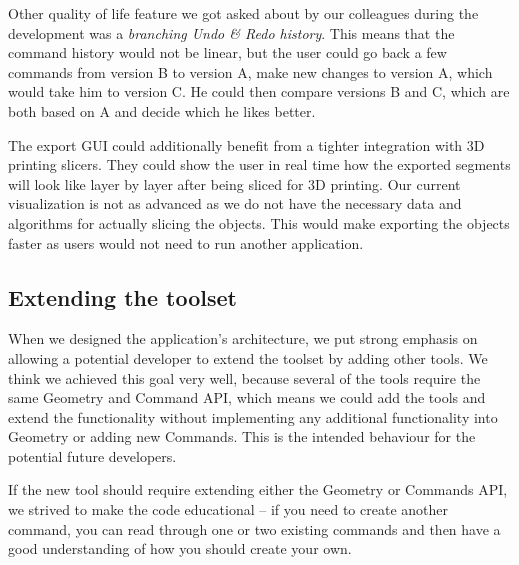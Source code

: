 Other quality of life feature we got asked about by our colleagues during the development was a \textit{branching Undo \& Redo history}. This means that the command history would not be linear, but the user could go back a few commands from version B to version A, make new changes to version A, which would take him to version C. He could then compare versions B and C, which are both based on A and decide which he likes better.

The export GUI could additionally benefit from a tighter integration with 3D printing slicers. They could show the user in real time how the exported segments will look like layer by layer after being sliced for 3D printing. Our current visualization is not as advanced as we do not have the necessary data and algorithms for actually slicing the objects. This would make exporting the objects faster as users would not need to run another application.

\subsection{Extending the toolset}

When we designed the application's architecture, we put strong emphasis on allowing a potential developer to extend the toolset by adding other tools. We think we achieved this goal very well, because several of the tools require the same Geometry and Command API, which means we could add the tools and extend the functionality without implementing any additional functionality into Geometry or adding new Commands. This is the intended behaviour for the potential future developers.

If the new tool should require extending either the Geometry or Commands API, we strived to make the code educational -- if you need to create another command, you can read through one or two existing commands and then have a good understanding of how you should create your own.